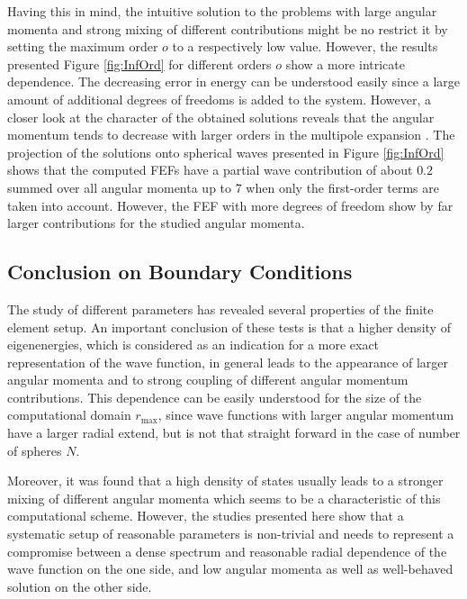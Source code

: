 Having this in mind, the intuitive solution to the problems with large angular momenta and strong mixing of different contributions might be no restrict it by setting the maximum order $o$ to a respectively low value.
However, the results presented Figure \ref{fig:InfOrd} for different orders $o$ show a more intricate dependence.
The decreasing error in energy can be understood easily since a large amount of additional degrees of freedoms is added to the system.
However, a closer look at the character of the obtained solutions reveals that the angular momentum tends to decrease with larger orders in the multipole expansion .
The projection of the solutions onto spherical waves presented in Figure \ref{fig:InfOrd} shows that the computed FEFs have a partial wave contribution of about $0.2$ summed over all angular momenta up to 7 when only the first-order terms are taken into account.
However, the FEF with more degrees of freedom show by far larger contributions for the studied angular momenta.

\subsection{Conclusion on Boundary Conditions}
The study of different parameters has revealed several properties of the finite element setup.
An important conclusion of these tests is that a higher density of eigenenergies, which is considered as an indication for a more exact representation of the wave function, in general leads to the appearance of larger angular momenta and to strong coupling of different angular momentum contributions.
This dependence can be easily understood for the size of the computational domain $r_\text{max}$, since wave functions with larger angular momentum have a larger radial extend, but is not that straight forward in the case of number of spheres $N$.

Moreover, it was found that a high density of states usually leads to a stronger mixing of different angular momenta which seems to be a characteristic of this computational scheme.
However, the studies presented here show that a systematic setup of reasonable parameters is non-trivial and needs to  represent a compromise between a dense spectrum and reasonable radial dependence of the wave function on the one side, and low angular momenta as well as well-behaved solution on the other side.

